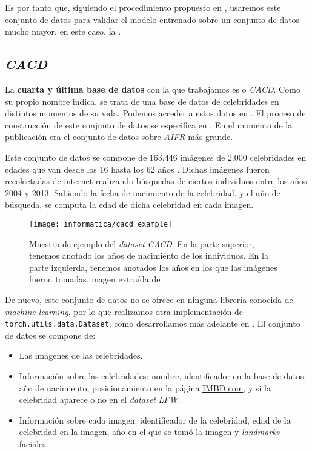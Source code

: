 Es por tanto que, siguiendo el procedimiento propuesto en \cite{informatica:best_fgnet_model}, usaremos este conjunto de datos para validar el modelo entrenado sobre un conjunto de datos mucho mayor, en este caso, la .

\subsection{\textit{CACD}} \label{isec:dataset_cacd}

La \textbf{cuarta y última base de datos} con la que trabajamos es  o \textit{CACD}. Como su propio nombre indica, se trata de una base de datos de celebridades en distintos momentos de su vida. Podemos acceder a estos datos en \cite{informatica:cacd_dataset}. El proceso de construcción de este conjunto de datos se especifica en \cite{informatica:paper_cacd}. En el momento de la publicación era el conjunto de datos sobre \textit{AIFR} más grande.

Este conjunto de datos se compone de 163.446 imágenes de 2.000 celebridades en edades que van desde los 16 hasta los 62 años \cite{informatica:paper_cacd}. Dichas imágenes fueron recolectadas de internet realizando búsquedas de ciertos individuos entre los años 2004 y 2013. Sabiendo la fecha de nacimiento de la celebridad, y el año de búsqueda, se computa la edad de dicha celebridad en cada imagen.

\begin{figure}[!h]
    \centering
    \texttt{[image: informatica/cacd\_example]}
    \caption{Muestra de ejemplo del \textit{dataset} \textit{CACD}. En la parte superior, tenemos anotado los años de nacimiento de los individuos. En la parte izquierda, tenemos anotados los años en los que las imágenes fueron tomadas. magen extraída de \cite{informatica:paper_cacd}}
    \label{img:cacd_imagenes_ejemplo}
\end{figure}

De nuevo, este conjunto de datos no se ofrece en ninguna librería conocida de \textit{machine learning}, por lo que realizamos otra implementación de \lstinline{torch.utils.data.Dataset}, como desarrollamos más adelante en . El conjunto de datos se compone de:

\begin{itemize}
    \item Las imágenes de las celebridades.
    \item Información sobre las celebridades: nombre, identificador en la base de datos, año de nacimiento, posicionamiento en la página \url{IMBD.com}, y si la celebridad aparece o no en el \textit{dataset} \textit{LFW}.
    \item Información sobre cada imagen: identificador de la celebridad, edad de la celebridad en la imagen, año en el que se tomó la imagen y \textit{landmarks} faciales.
\end{itemize}

